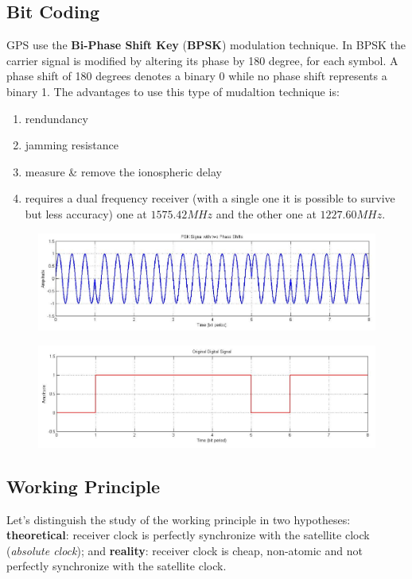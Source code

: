 \subsection{Bit Coding}
GPS use the \textbf{Bi-Phase Shift Key} (\textbf{BPSK}) modulation technique. In BPSK the carrier signal is modified by altering its phase by 180 degree, for each symbol. A phase shift of 180 degrees denotes a binary 0 while no phase shift represents a binary 1. The advantages to use this type of mudaltion technique is:
\begin{enumerate}[nosep]
    \item rendundancy
    \item jamming resistance
    \item measure \& remove the ionospheric delay
    \item requires a dual frequency receiver (with a single one it is possible to survive but less accuracy) one at $1575.42MHz$ and the other one at $1227.60MHz$.
\end{enumerate}
\begin{figure}[h]
    \centering
    \includegraphics[width=\textwidth]{img/bspk_wave}
\end{figure}
\begin{figure}[h]
    \centering
    \includegraphics[width=\textwidth]{img/bspk_signal}
\end{figure}

\newpage
\subsection{Working Principle}
Let's distinguish the study of the working principle in two hypotheses: \textbf{theoretical}: receiver clock is perfectly synchronize with the satellite clock (\textit{absolute clock}); and \textbf{reality}: receiver clock is cheap, non-atomic and not perfectly synchronize with the satellite clock.

